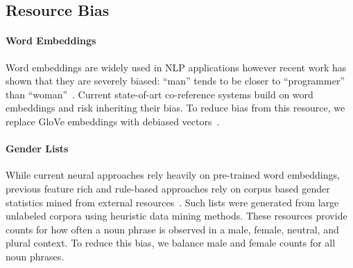 \subsection{Resource Bias}
\paragraph{Word Embeddings}
Word embeddings are widely used in NLP applications however recent work has shown that they are severely biased: ``man'' tends to be closer to ``programmer'' than ``woman''~\cite{BCWS16,CBN17}.
Current state-of-art co-reference systems build on word embeddings and risk inheriting their bias. %
To reduce bias from this resource, we replace GloVe embeddings with debiased vectors~\cite{BCWS16}.
\vspace{-5pt}
\paragraph{Gender Lists}
While current neural approaches rely heavily on pre-trained word embeddings, previous feature rich and rule-based approaches rely on corpus based gender statistics mined from external resources~\cite{Bergsma:06}.
Such lists were generated from large unlabeled corpora using heuristic data mining methods. %
 These resources provide counts for how often a noun phrase is observed in a male, female, neutral, and plural context.
To reduce this bias, we balance male and female counts for all noun phrases.








